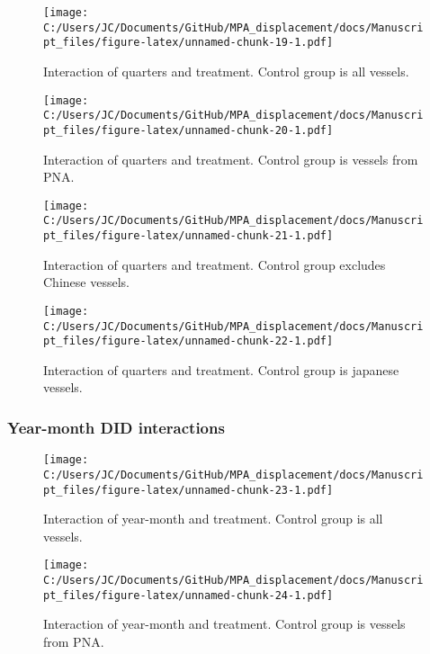 \documentclass[11pt,]{article}
\begin{document}
\begin{figure}
\centering
\texttt{[image: C:/Users/JC/Documents/GitHub/MPA\_displacement/docs/Manuscript\_files/figure-latex/unnamed-chunk-19-1.pdf]}
\caption{\label{fig:unnamed-chunk-19}\label{fig:q1}Interaction of quarters
and treatment. Control group is all vessels.}
\end{figure}

\begin{figure}
\centering
\texttt{[image: C:/Users/JC/Documents/GitHub/MPA\_displacement/docs/Manuscript\_files/figure-latex/unnamed-chunk-20-1.pdf]}
\caption{\label{fig:unnamed-chunk-20}\label{fig:q2}Interaction of quarters
and treatment. Control group is vessels from PNA.}
\end{figure}

\begin{figure}
\centering
\texttt{[image: C:/Users/JC/Documents/GitHub/MPA\_displacement/docs/Manuscript\_files/figure-latex/unnamed-chunk-21-1.pdf]}
\caption{\label{fig:unnamed-chunk-21}\label{fig:q3}Interaction of quarters
and treatment. Control group excludes Chinese vessels.}
\end{figure}

\begin{figure}
\centering
\texttt{[image: C:/Users/JC/Documents/GitHub/MPA\_displacement/docs/Manuscript\_files/figure-latex/unnamed-chunk-22-1.pdf]}
\caption{\label{fig:unnamed-chunk-22}\label{fig:q4}Interaction of quarters
and treatment. Control group is japanese vessels.}
\end{figure}

\hypertarget{year-month-did-interactions}{%
\subsubsection{Year-month DID
interactions}\label{year-month-did-interactions}}

\begin{figure}
\centering
\texttt{[image: C:/Users/JC/Documents/GitHub/MPA\_displacement/docs/Manuscript\_files/figure-latex/unnamed-chunk-23-1.pdf]}
\caption{\label{fig:unnamed-chunk-23}\label{fig:ym1}Interaction of
year-month and treatment. Control group is all vessels.}
\end{figure}

\begin{figure}
\centering
\texttt{[image: C:/Users/JC/Documents/GitHub/MPA\_displacement/docs/Manuscript\_files/figure-latex/unnamed-chunk-24-1.pdf]}
\caption{\label{fig:unnamed-chunk-24}\label{fig:ym2}Interaction of
year-month and treatment. Control group is vessels from PNA.}
\end{figure}
\end{document}
